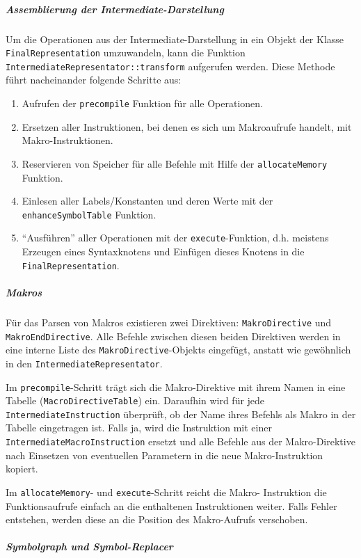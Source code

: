 \subparagraph{Assemblierung der Intermediate-Darstellung}
\label{sec:dev_parser_assem_inter}
Um die Operationen aus der Intermediate-Darstellung in ein Objekt der Klasse
\texttt{FinalRepresentation} umzuwandeln, kann die Funktion
\texttt{IntermediateRepresentator::\allowbreak{}transform} aufgerufen werden.
Diese Methode führt nacheinander folgende Schritte aus:

\begin{enumerate}
	\item Aufrufen der \texttt{precompile} Funktion für alle Operationen.
	\item Ersetzen aller Instruktionen, bei denen es sich um Makroaufrufe
	handelt, mit Makro-Instruktionen.
	\item Reservieren von Speicher für alle Befehle mit Hilfe der
	\texttt{allocateMemory} Funktion.
	\item Einlesen aller Labels/Konstanten und deren Werte mit der
	\texttt{enhanceSymbolTable} Funktion.
	\item "`Ausführen"' aller Operationen mit der \texttt{execute}-Funktion,
	d.h. meistens Erzeugen eines Syntaxknotens und Einfügen dieses Knotens in
	die \texttt{FinalRepresentation}.
\end{enumerate}

\subparagraph{Makros}
Für das Parsen von Makros existieren zwei Direktiven: \texttt{Makro\-Directive}
und \texttt{Makro\-End\-Directive}. Alle Befehle zwischen diesen beiden
Direktiven werden in eine interne Liste des \texttt{Makro\-Directive}-Objekts
eingefügt, anstatt wie gewöhnlich in den \texttt{Intermediate\-Representator}.

Im \texttt{precompile}-Schritt trägt sich die Makro-Direktive mit ihrem Namen
in eine Tabelle (\texttt{Macro\-Directive\-Table}) ein. Daraufhin wird für jede
\texttt{Intermediate\-Instruction} überprüft, ob der Name ihres Befehls als
Makro in der Tabelle eingetragen ist. Falls ja, wird die Instruktion mit einer
\texttt{Intermediate\-Macro\-Instruction} ersetzt und alle Befehle aus der
Makro-Direktive nach Einsetzen von eventuellen Parametern in die neue
Makro-Instruktion kopiert.

Im \texttt{allocateMemory}- und \texttt{execute}-Schritt reicht die Makro-
Instruktion die Funktionsaufrufe einfach an die enthaltenen Instruktionen
weiter. Falls Fehler entstehen, werden diese an die Position des Makro-Aufrufs
verschoben.

\subparagraph{Symbolgraph und Symbol-Replacer}

